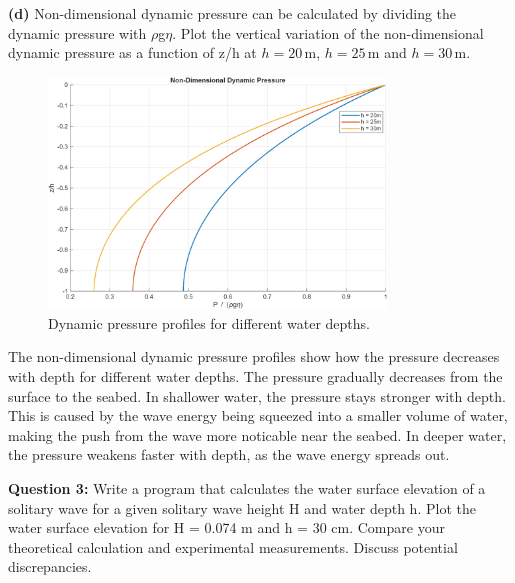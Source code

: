 \documentclass[a4paper]{article}
\begin{document}
\textbf{(d)} Non-dimensional dynamic pressure can be calculated by dividing the dynamic pressure with $\rho$g$\eta$. Plot the vertical variation of the non-dimensional dynamic pressure as a function of z/h at \( h = 20 \, \text{m} \), \( h = 25 \, \text{m} \) and \( h = 30 \, \text{m} \).
\vspace{0.3cm}

\begin{figure}[H]
    \centering
    \includegraphics[width=0.8\textwidth]{CE591HW1-Q1d.png}
    \caption{\small Dynamic pressure profiles for different water depths.}
    \label{fig:plot2d}
\end{figure} 
\vspace{0.3cm}

The non-dimensional dynamic pressure profiles show how the pressure decreases with depth for different water depths. The pressure gradually decreases from the surface to the seabed. In shallower water, the pressure stays stronger with depth. This is caused by the wave energy being squeezed into a smaller volume of water, making the push from the wave more noticable near the seabed. In deeper water, the pressure weakens faster with depth, as the wave energy spreads out.
\vspace{0.5cm}

\textbf{Question 3:} Write a program that calculates the water surface elevation of a solitary wave for a given solitary wave height H and water depth h. Plot the water surface elevation for H = 0.074 m and h = 30 cm. Compare your theoretical calculation and experimental measurements. Discuss potential discrepancies.
\vspace{0.3cm}
\end{document}
